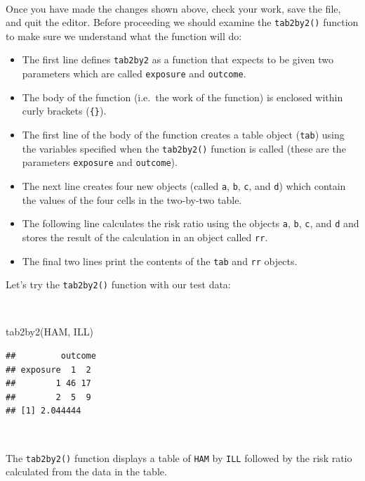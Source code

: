 \documentclass[
  12pt,
]{book}
\newenvironment{Shaded}{\begin{snugshade}}{\end{snugshade}}
\newcommand{\FunctionTok}[1]{\textcolor[rgb]{0.00,0.00,0.00}{#1}}
\newcommand{\NormalTok}[1]{#1}
\begin{document}
~

Once you have made the changes shown above, check your work, save the file, and quit the editor.
Before proceeding we should examine the \texttt{tab2by2()} function to make sure we understand what the function will do:

\begin{itemize}
\item
  The first line defines \texttt{tab2by2} as a function that expects to be given two parameters which are called \texttt{exposure} and \texttt{outcome}.
\item
  The body of the function (i.e.~the work of the function) is enclosed within curly brackets (\texttt{\{\}}).
\item
  The first line of the body of the function creates a table object (\texttt{tab}) using the variables specified when the \texttt{tab2by2()} function is called (these are the parameters \texttt{exposure} and \texttt{outcome}).
\item
  The next line creates four new objects (called \texttt{a}, \texttt{b}, \texttt{c}, and \texttt{d}) which contain the values of the four cells in the two-by-two table.
\item
  The following line calculates the risk ratio using the objects \texttt{a}, \texttt{b}, \texttt{c}, and \texttt{d} and stores the result of the calculation in an object called \texttt{rr}.
\item
  The final two lines print the contents of the \texttt{tab} and \texttt{rr} objects.
\end{itemize}

\newpage

Let's try the \texttt{tab2by2()} function with our test data:

~

\begin{Shaded}
\begin{Highlighting}[]
\FunctionTok{tab2by2}\NormalTok{(HAM, ILL)}
\end{Highlighting}
\end{Shaded}

\begin{verbatim}
##         outcome
## exposure  1  2
##        1 46 17
##        2  5  9
## [1] 2.044444
\end{verbatim}

~

The \texttt{tab2by2()} function displays a table of \texttt{HAM} by \texttt{ILL} followed by the risk ratio calculated from the data in the table.
\end{document}
